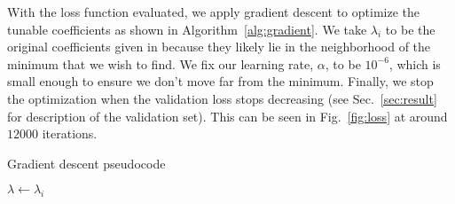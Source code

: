 \documentclass[twocolumn]{aastex631}
\begin{document}
With the loss function evaluated, we apply gradient descent to optimize the tunable
coefficients as shown in Algorithm~\ref{alg:gradient}. We take $\lambda_i$ to be the 
original coefficients given in \citep{khan2016frequency} because they likely lie in the
neighborhood of the minimum that we wish to find. 
We fix our learning rate, $\alpha$, to be $10^{-6}$, which is small enough to ensure we 
don't move far from the minimum.
Finally, we stop the optimization when the validation loss stops decreasing 
(see Sec.~\ref{sec:result} for description of the validation set).
This can be seen in Fig.~\ref{fig:loss} at around $12000$ iterations.

\begin{algorithm}[t]
	\caption{Gradient descent pseudocode}
	\label{alg:gradient}
	    $\lambda\leftarrow\lambda_i$\\
	 \Return{$\lambda$}
\end{algorithm}
\end{document}
